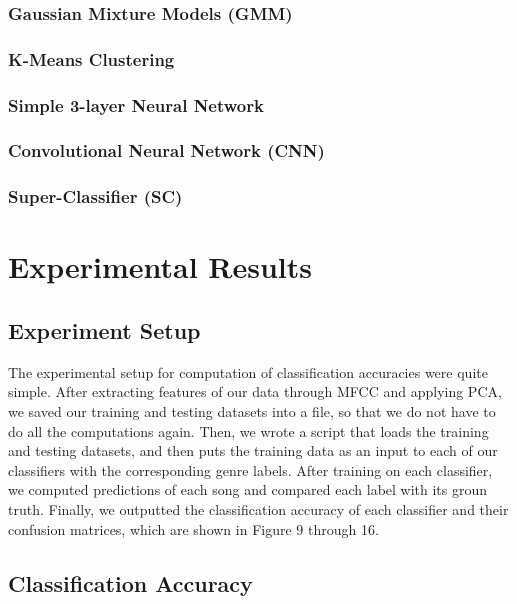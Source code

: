 \subsubsection{\textbf{Gaussian Mixture Models (GMM)}}

\subsubsection{\textbf{K-Means Clustering}}

\subsubsection{\textbf{Simple 3-layer Neural Network}}

\subsubsection{\textbf{Convolutional Neural Network (CNN)}}

\subsubsection{\textbf{Super-Classifier (SC)}}

\section{Experimental Results}\label{sec:results}

\subsection{Experiment Setup}
The experimental setup for computation of classification accuracies were quite simple. After extracting features of our data through MFCC and applying PCA, we saved our training and testing datasets into a file, so that we do not have to do all the computations again. Then, we wrote a script that loads the training and testing datasets, and then puts the training data as an input to each of our classifiers with the corresponding genre labels. After training on each classifier, we computed predictions of each song and compared each label with its groun truth. Finally, we outputted the classification accuracy of each classifier and their confusion matrices, which are shown in Figure 9 through 16.

\subsection{Classification Accuracy}

